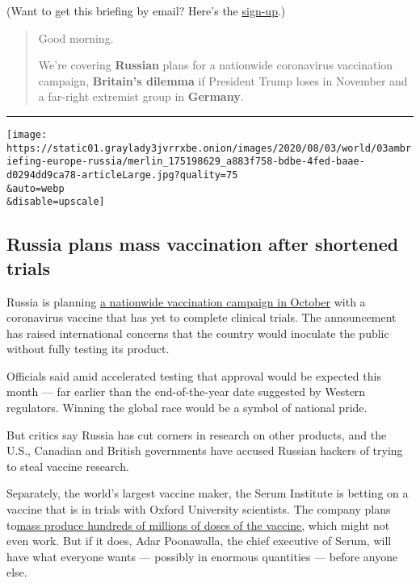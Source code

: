 (Want to get this briefing by email? Here's the
\href{https://www.nytimes3xbfgragh.onion/morning-briefing}{sign-up}.)

\begin{quote}
Good morning.

We're covering \textbf{Russian} plans for a nationwide coronavirus
vaccination campaign, \textbf{Britain's dilemma} if President Trump
loses in November and a far-right extremist group in \textbf{Germany}.
\end{quote}

\begin{center}\rule{0.5\linewidth}{\linethickness}\end{center}

\texttt{[image: https://static01.graylady3jvrrxbe.onion/images/2020/08/03/world/03ambriefing-europe-russia/merlin\_175198629\_a883f758-bdbe-4fed-baae-d0294dd9ca78-articleLarge.jpg?quality=75\\\&auto=webp\\\&disable=upscale]}

\hypertarget{russia-plans-mass-vaccination-after-shortened-trials}{%
\subsection{Russia plans mass vaccination after shortened
trials}\label{russia-plans-mass-vaccination-after-shortened-trials}}

Russia is planning
\href{https://www.nytimes3xbfgragh.onion/2020/08/02/world/europe/russia-trials-vaccine-October.html}{a
nationwide vaccination campaign in October} with a coronavirus vaccine
that has yet to complete clinical trials. The announcement has raised
international concerns that the country would inoculate the public
without fully testing its product.

Officials said amid accelerated testing that approval would be expected
this month --- far earlier than the end-of-the-year date suggested by
Western regulators. Winning the global race would be a symbol of
national pride.

But critics say Russia has cut corners in research on other products,
and the U.S., Canadian and British governments have accused Russian
hackers of trying to steal vaccine research.

Separately, the world's largest vaccine maker, the Serum Institute is
betting on a vaccine that is in trials with Oxford University
scientists. The company plans
to\href{https://www.nytimes3xbfgragh.onion/2020/08/01/world/asia/coronavirus-vaccine-india.html}{mass
produce hundreds of millions of doses of the vaccine,} which might not
even work. But if it does, Adar Poonawalla, the chief executive of
Serum, will have what everyone wants --- possibly in enormous quantities
--- before anyone else.

